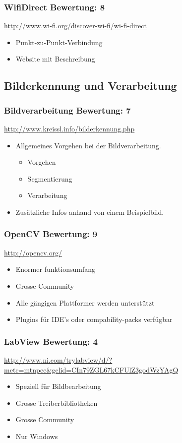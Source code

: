 \subsubsection{WifiDirect  \hfill Bewertung: 8}
\url{http://www.wi-fi.org/discover-wi-fi/wi-fi-direct}
\begin{itemize}
    \item Punkt-zu-Punkt-Verbindung
    \item Website mit Beschreibung
\end{itemize}

\subsection{Bilderkennung und Verarbeitung}

\subsubsection{Bildverarbeitung  \hfill Bewertung: 7}
\url{http://www.kreissl.info/bilderkennung.php}
\begin{itemize}
    \item Allgemeines Vorgehen bei der Bildverarbeitung. 
    \begin{itemize}
        \item Vorgehen
        \item Segmentierung
        \item Verarbeitung
    \end{itemize}
    \item Zusätzliche Infos anhand von einem Beispielbild.
\end{itemize}

\subsubsection{OpenCV  \hfill Bewertung: 9}
\url{http://opencv.org/ }
\begin{itemize}
    \item Enormer funktionsumfang
    \item Grosse Community
    \item Alle gängigen Plattformer werden unterstützt
    \item Plugins für IDE’s oder compability-packs verfügbar
\end{itemize}

\subsubsection{LabView  \hfill Bewertung: 4}
\url{http://www.ni.com/trylabview/d/?metc=mtnpee&gclid=CIn79ZGL67kCFUlZ3godWzYAgQ}
\begin{itemize}
    \item Speziell für Bildbearbeitung
    \item Grosse Treiberbibliotheken
    \item Grosse Community
    \item Nur Windows
\end{itemize}

